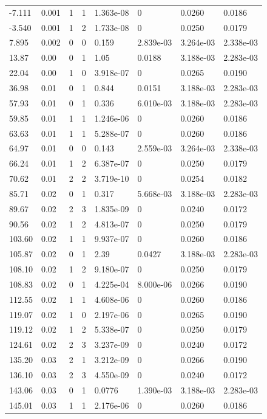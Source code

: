 \documentclass[preview]{standalone}
\begin{document}
{{\begin{tabular}{L{1.2cm}C{1.2cm} C{0.3cm}C{0.5cm} C{1.4cm}C{1.4cm} C{1.4cm}C{1.4cm}}
  -7.111  &  0.001  & 1     &  1 &  1.363e-08  & 0  & 0.0260 &  0.0186   \\ 
  -3.540  &  0.001  & 1     &  2 &  1.733e-08  & 0  & 0.0250 &  0.0179   \\ 
  7.895  &  0.002  & 0     &  0 &  0.159  & 2.839e-03  & 3.264e-03 &  2.338e-03   \\ 
  13.87  &  0.00  & 0     &  1 &  1.05  & 0.0188  & 3.188e-03 &  2.283e-03   \\ 
  22.04  &  0.00  & 1     &  0 &  3.918e-07  & 0  & 0.0265 &  0.0190   \\ 
  36.98  &  0.01  & 0     &  1 &  0.844  & 0.0151  & 3.188e-03 &  2.283e-03   \\ 
  57.93  &  0.01  & 0     &  1 &  0.336  & 6.010e-03  & 3.188e-03 &  2.283e-03   \\ 
  59.85  &  0.01  & 1     &  1 &  1.246e-06  & 0  & 0.0260 &  0.0186   \\ 
  63.63  &  0.01  & 1     &  1 &  5.288e-07  & 0  & 0.0260 &  0.0186   \\ 
  64.97  &  0.01  & 0     &  0 &  0.143  & 2.559e-03  & 3.264e-03 &  2.338e-03   \\ 
  66.24  &  0.01  & 1     &  2 &  6.387e-07  & 0  & 0.0250 &  0.0179   \\ 
  70.62  &  0.01  & 2     &  2 &  3.719e-10  & 0  & 0.0254 &  0.0182   \\ 
  85.71  &  0.02  & 0     &  1 &  0.317  & 5.668e-03  & 3.188e-03 &  2.283e-03   \\ 
  89.67  &  0.02  & 2     &  3 &  1.835e-09  & 0  & 0.0240 &  0.0172   \\ 
  90.56  &  0.02  & 1     &  2 &  4.813e-07  & 0  & 0.0250 &  0.0179   \\ 
  103.60  &  0.02  & 1     &  1 &  9.937e-07  & 0  & 0.0260 &  0.0186   \\ 
  105.87  &  0.02  & 0     &  1 &  2.39  & 0.0427  & 3.188e-03 &  2.283e-03   \\ 
  108.10  &  0.02  & 1     &  2 &  9.180e-07  & 0  & 0.0250 &  0.0179   \\ 
  108.83  &  0.02  & 0     &  1 &  4.225e-04  & 8.000e-06  & 0.0266 &  0.0190   \\ 
  112.55  &  0.02  & 1     &  1 &  4.608e-06  & 0  & 0.0260 &  0.0186   \\ 
  119.07  &  0.02  & 1     &  0 &  2.197e-06  & 0  & 0.0265 &  0.0190   \\ 
  119.12  &  0.02  & 1     &  2 &  5.338e-07  & 0  & 0.0250 &  0.0179   \\ 
  124.61  &  0.02  & 2     &  3 &  3.237e-09  & 0  & 0.0240 &  0.0172   \\ 
  135.20  &  0.03  & 2     &  1 &  3.212e-09  & 0  & 0.0266 &  0.0190   \\ 
  136.10  &  0.03  & 2     &  3 &  4.550e-09  & 0  & 0.0240 &  0.0172   \\ 
  143.06  &  0.03  & 0     &  1 &  0.0776  & 1.390e-03  & 3.188e-03 &  2.283e-03   \\ 
  145.01  &  0.03  & 1     &  1 &  2.176e-06  & 0  & 0.0260 &  0.0186   \\ 
\hline 
\end{tabular} 

}}
\end{document}
